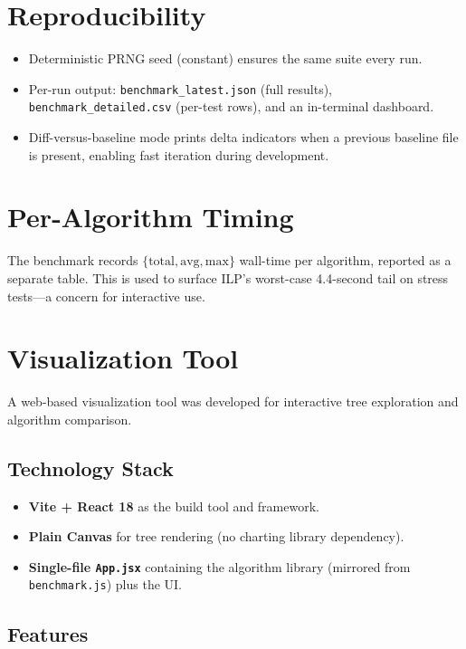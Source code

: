 \section{Reproducibility}

\begin{itemize}
    \item Deterministic PRNG seed (constant) ensures the same suite every run.
    \item Per-run output: \texttt{benchmark\_latest.json} (full results), \texttt{benchmark\_detailed.csv} (per-test rows), and an in-terminal dashboard.
    \item Diff-versus-baseline mode prints delta indicators when a previous baseline file is present, enabling fast iteration during development.
\end{itemize}

\section{Per-Algorithm Timing}

The benchmark records $\{\text{total}, \text{avg}, \text{max}\}$ wall-time per algorithm, reported as a separate table. This is used to surface ILP's worst-case 4.4-second tail on stress tests---a concern for interactive use.

\section{Visualization Tool}

A web-based visualization tool was developed for interactive tree exploration and algorithm comparison.

\subsection{Technology Stack}

\begin{itemize}
    \item \textbf{Vite + React 18} as the build tool and framework.
    \item \textbf{Plain Canvas} for tree rendering (no charting library dependency).
    \item \textbf{Single-file \texttt{App.jsx}} containing the algorithm library (mirrored from \texttt{benchmark.js}) plus the UI.
\end{itemize}

\subsection{Features}

